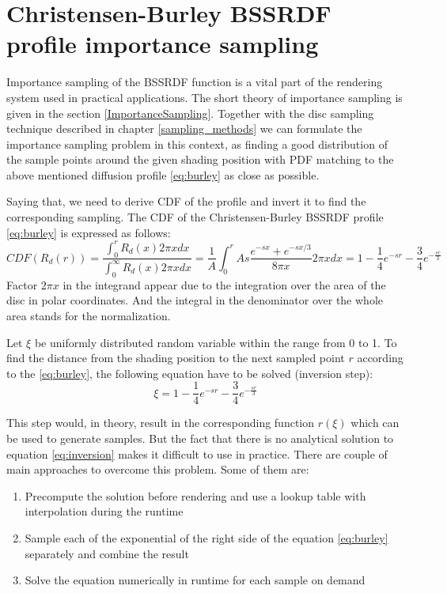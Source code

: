 \section{Christensen-Burley BSSRDF profile importance sampling}
\label{section:burley_importance}
Importance sampling of the BSSRDF function is a vital part of the rendering system used in practical
applications. The short theory of importance sampling is given in the section
\ref{ImportanceSampling}. Together with the disc sampling technique described in chapter
\ref{sampling_methods} we can formulate the importance sampling problem in this context, as finding
a good distribution of the sample points around the given shading position with \gls{PDF} matching
to the above mentioned diffusion profile \ref{eq:burley} as close as possible.

Saying that, we need to derive \gls{CDF} of the profile and invert it to find the corresponding
sampling.
The \gls{CDF} of the Christensen-Burley \gls{BSSRDF} profile \ref{eq:burley} is expressed as
follows:
\[
\label{eq:burley_cdf}
CDF(R_d(r)) = \frac{\int_{0}^{r} R_d(x)2\pi xdx}{\int_{0}^{\infty} R_d(x)2\pi xdx}  = \frac{1}{A}
\int_{0}^{r} As\frac{e^{-sx}+e^{-sx/3}}{8\pi x}2\pi xdx =
1-\frac{1}{4}e^{-sr}-\frac{3}{4}e^{-\frac{sr}{3}} \] Factor $2\pi x$ in the integrand appear due to
the integration over the area of the disc in polar coordinates. And the integral in the denominator
over the whole area stands for the normalization.

Let $\xi$ be uniformly distributed random variable within the range from 0 to 1. To find the
distance from the shading position to the next sampled point $r$ according to the \ref{eq:burley},
the following equation have to be solved (inversion step):
\begin{equation}
\label{eq:inversion}
\xi=1-\frac{1}{4}e^{-sr}-\frac{3}{4}e^{-\frac{sr}{3}}
\end{equation}

This step would, in theory, result in the corresponding function $r(\xi)$ which can be used to
generate samples. But the fact that there is no analytical solution to equation
\ref{eq:inversion} makes it difficult to use in practice.
There are couple of main approaches to overcome this problem. Some of them are:
\begin{enumerate}
  \item Precompute the solution before rendering and use a lookup table with interpolation
  during the runtime
  \item Sample each of the exponential of the right side of the equation \ref{eq:burley}
  separately and combine the result
  \item Solve the equation numerically in runtime for each sample on demand
\end{enumerate}

